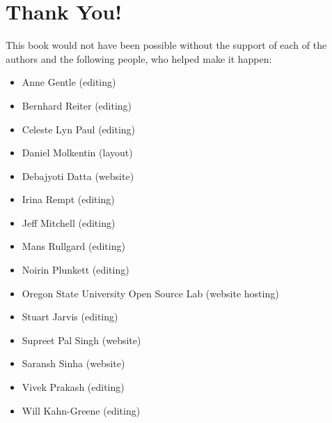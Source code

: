 \section*{Thank You!}

This book would not have been possible without the support of each of the
authors and the following people, who helped make it happen:
\begin{itemize}
 \item Anne Gentle (editing)
 \item Bernhard Reiter (editing)
 \item Celeste Lyn Paul (editing)
 \item Daniel Molkentin (layout)
 \item Debajyoti Datta (website)
 \item Irina Rempt (editing)
 \item Jeff Mitchell (editing)
 \item Mans Rullgard (editing)
 \item Noirin Plunkett (editing)
 \item Oregon State University Open Source Lab (website hosting)
 \item Stuart Jarvis (editing)
 \item Supreet Pal Singh (website)
 \item Saransh Sinha (website)
 \item Vivek Prakash (editing)
 \item Will Kahn-Greene (editing)
\end{itemize}

\newpage
